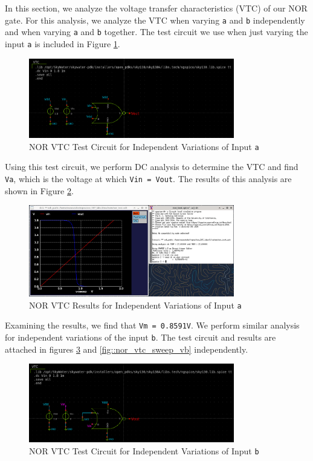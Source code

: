 \documentclass[fleqn]{article}
\begin{document}
	In this section, we analyze the voltage transfer characteristics (VTC) of our NOR gate. For this analysis, we analyze the VTC when varying \texttt{a} and \texttt{b} independently and when varying \texttt{a} and \texttt{b} together. The test circuit we use when just varying the input \texttt{a} is included in Figure \ref{fig::nor_vtc_test_sweep_va}.
	
	\begin{figure}[H]
		\centerline{\includegraphics[width=0.8\textwidth]{nor_vtc_test_sweep_va.png}}
		\caption{NOR VTC Test Circuit for Independent Variations of Input \texttt{a}}
		\label{fig::nor_vtc_test_sweep_va}
	\end{figure}
	
	Using this test circuit, we perform DC analysis to determine the VTC and find \texttt{Va}, which is the voltage at which \texttt{Vin = Vout}. The results of this analysis are shown in Figure \ref{fig::nor_vtc_sweep_va}.
	
	\begin{figure}[H]
		\centerline{\includegraphics[width=0.8\textwidth]{nor_vtc_sweep_va.png}}
		\caption{NOR VTC Results for Independent Variations of Input \texttt{a}}
		\label{fig::nor_vtc_sweep_va}
	\end{figure}
	
	Examining the results, we find that \texttt{Vm = 0.8591V}. We perform similar analysis for independent variations of the input \texttt{b}. The test circuit and results are attached in figures \ref{fig::nor_vtc_test_sweep_vb} and \ref{fig::nor_vtc_sweep_vb} independently.
	
	\begin{figure}[H]
		\centerline{\includegraphics[width=0.8\textwidth]{nor_vtc_test_sweep_vb.png}}
		\caption{NOR VTC Test Circuit for Independent Variations of Input \texttt{b}}
		\label{fig::nor_vtc_test_sweep_vb}
	\end{figure}
	
\end{document}
